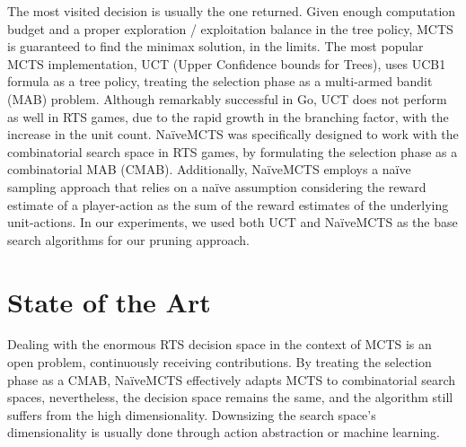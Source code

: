 \documentclass[conference]{IEEEtran}
\begin{document}
The most visited decision is usually the one returned. Given enough computation budget and a proper exploration / exploitation balance in the tree policy, MCTS is guaranteed to find the minimax solution, in the limits. The most popular MCTS implementation, UCT (Upper Confidence bounds for Trees), uses UCB1 formula as a tree policy, treating the selection phase as a multi-armed bandit (MAB) problem. Although remarkably successful in Go, UCT does not perform as well in RTS games, due to the rapid growth in the branching factor, with the increase in the unit count. NaïveMCTS was specifically designed to work with the combinatorial search space in RTS games, by formulating the selection phase as a combinatorial MAB (CMAB). Additionally, NaïveMCTS employs a naïve sampling approach that relies on a naïve assumption considering the reward estimate of a player-action as the sum of the reward estimates of the underlying unit-actions. In our experiments, we used both UCT and NaïveMCTS as the base search algorithms for our pruning approach.



\section{State of the Art}
\label{sec:state_of_the_art}


Dealing with the enormous RTS decision space in the context of MCTS is an open problem, continuously receiving contributions. By treating the selection phase as a CMAB, NaïveMCTS effectively adapts MCTS to combinatorial search spaces, nevertheless, the decision space remains the same, and the algorithm still suffers from the high dimensionality. Downsizing the search space's dimensionality is usually done through action abstraction or machine learning.
\end{document}
